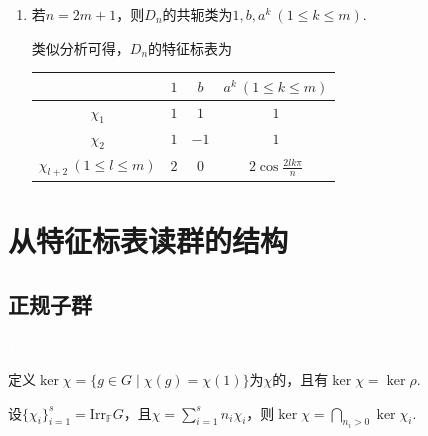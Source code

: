 \begin{instance}
\begin{enumerate}
\begin{center}
\begin{tabular}{c|ccccc}
                $\chi_3$                             & $1$ & $(-1)^m$   & $1$  & $-1$ & $(-1)^k$                           \\
                $\chi_4$                             & $1$ & $(-1)^m$   & $-1$ & $1$  & $(-1)^k$                           \\
                $\chi_{l+4}\ (1 \leqslant l \leqslant m-1)$ & $2$ & $2(-1)^l$  & $0$  & $0$  & $2\cos\frac{2lk\pi}{n}$
            \end{tabular}
        \end{center}
        \item[②] 若$n=2m+1$，则$D_n$的共轭类为$1, b, a^k\ (1 \leqslant k \leqslant m)$.\par
        类似分析可得，$D_n$的特征标表为
        \begin{center}
            \begin{tabular}{c|ccc}
                                                     & $1$ & $b$  & $a^k\ (1 \leqslant k \leqslant m)$ \\ \hline
                $\chi_1$                             & $1$ & $1$  & $1$                              \\
                $\chi_2$                             & $1$ & $-1$ & $1$                              \\
                $\chi_{l+2}\ (1 \leqslant l \leqslant m)$ & $2$ & $0$  & $2\cos\frac{2lk\pi}{n}$
            \end{tabular}
        \end{center}
    \end{enumerate}
\end{instance}

\section{从特征标表读群的结构}

\subsection*{正规子群}\textcolor{white}{1}

\begin{definition}[特征标的核]
    定义$\ker \chi = \{g \in G \mid \chi(g) = \chi(1)\}$为$\chi$的，且有$\ker \chi = \ker \rho$.
\end{definition}

\begin{lemma}[]
    设$\{\chi_i\}_{i=1}^s = \mathrm{Irr}_{\mathbb{F}} G$，且$\chi = \sum_{i=1}^s n_i \chi_i$，则$\ker \chi = \bigcap_{n_i>0} \ker \chi_i$.
\end{lemma}

